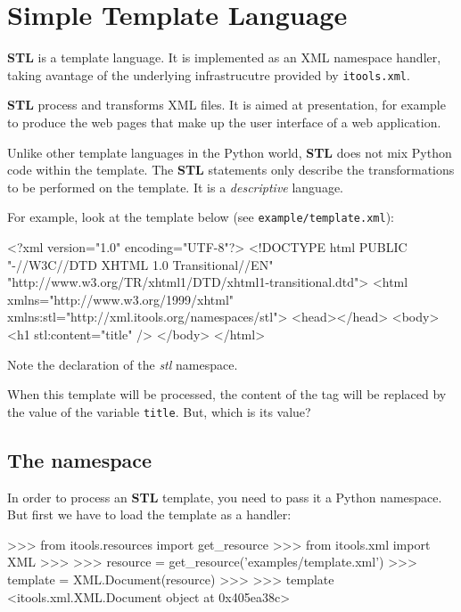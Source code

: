 \chapter{Simple Template Language}

{\bf STL} is a template language. It is implemented as an XML namespace
handler, taking avantage of the underlying infrastrucutre provided by
{\tt itools.xml}.

{\bf STL} process and transforms XML files. It is aimed at presentation,
for example to produce the web pages that make up the user interface of
a web application.


Unlike other template languages in the Python world, {\bf STL} does not
mix Python code within the template. The {\bf STL} statements only describe
the transformations to be performed on the template. It is a {\em descriptive}
language.

For example, look at the template below (see {\tt example/template.xml}):

\begin{code}
    <?xml version="1.0" encoding="UTF-8"?>
    <!DOCTYPE html
         PUBLIC "-//W3C//DTD XHTML 1.0 Transitional//EN"
         "http://www.w3.org/TR/xhtml1/DTD/xhtml1-transitional.dtd">
    <html xmlns="http://www.w3.org/1999/xhtml"
          xmlns:stl="http://xml.itools.org/namespaces/stl">
      <head></head>
      <body>
        <h1 stl:content="title" />
      </body>
    </html>
\end{code}

Note the declaration of the {\em stl} namespace.

When this template will be processed, the content of the {\tt <h1>} tag
will be replaced by the value of the variable {\tt title}. But, which
is its value?

\section{The namespace}

In order to process an {\bf STL} template, you need to pass it a Python
namespace. But first we have to load the template as a handler:

\begin{code}
    >>> from itools.resources import get_resource
    >>> from itools.xml import XML
    >>>   
    >>> resource = get_resource('examples/template.xml')
    >>> template = XML.Document(resource)
    >>> 
    >>> template
    <itools.xml.XML.Document object at 0x405ea38c>
\end{code}

